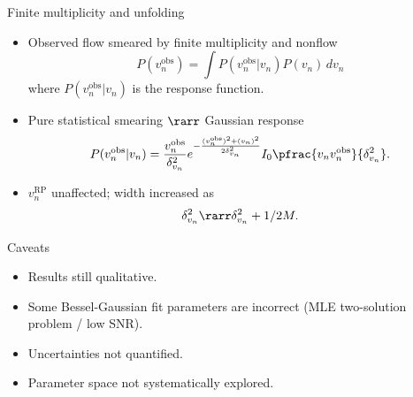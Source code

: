 \documentclass{beamer}
\begin{document}
\begin{frame}[label=unfold]{Finite multiplicity and unfolding}
  \def\obs{^\text{obs}}

  \begin{itemize}
    \item Observed flow smeared by finite multiplicity and nonflow
      \begin{equation*}
        P(v_n\obs) = \int P(v_n\obs|v_n) P(v_n) \, dv_n
      \end{equation*}
      where $P(v_n\obs|v_n)$ is the response function.
    \item Pure statistical smearing $\rarr$ Gaussian response
      \begin{equation*}
        P(v_n^\text{obs}|v_n) = \frac{v_n^\text{obs}}{\delta_{v_n}^2} e^{ -\frac{(v_n^\text{obs})^2 + (v_n)^2}{2\delta_{v_n}^2} }
          I_0 \pfrac{v_nv_n^\text{obs}}{\delta_{v_n}^2}.
      \end{equation*}
    \item $v_n^\text{RP}$ unaffected; width increased as
      \begin{equation*}
        \delta_{v_n}^2 \rarr \delta_{v_n}^2 + 1/2M.
      \end{equation*}
  \end{itemize}

\end{frame}


\begin{frame}[label=caveats]{Caveats}
  \begin{itemize}
    \item Results still qualitative.
    \item Some Bessel-Gaussian fit parameters are incorrect (MLE two-solution problem / low SNR).
    \item Uncertainties not quantified.
    \item Parameter space not systematically explored.
  \end{itemize}

\end{frame}
\end{document}
